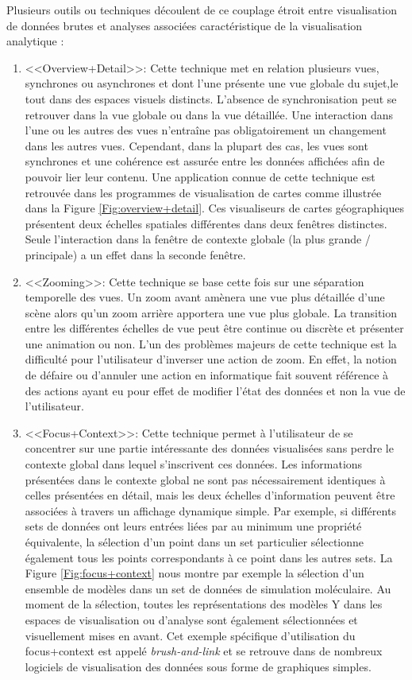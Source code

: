 Plusieurs outils ou techniques découlent de ce couplage étroit entre visualisation de données brutes et analyses associées caractéristique de la visualisation analytique \cite{cockburn2008review}:

\begin{enumerate}
    \item <<Overview+Detail>>: Cette technique met en relation plusieurs vues, synchrones ou asynchrones et dont l'une présente une vue globale du sujet,le tout dans des espaces visuels distincts. L'absence de synchronisation peut se retrouver dans la vue globale ou dans la vue détaillée. Une interaction dans l'une ou les autres des vues n'entraîne pas obligatoirement un changement dans les autres vues. Cependant, dans la plupart des cas, les vues sont synchrones et une cohérence est assurée entre les données affichées afin de pouvoir lier leur contenu. Une application connue de cette technique est retrouvée dans les programmes de visualisation de cartes comme illustrée dans la Figure \ref{Fig:overview+detail}. Ces visualiseurs de cartes géographiques présentent deux échelles spatiales différentes dans deux fenêtres distinctes. Seule l'interaction dans la fenêtre de contexte globale (la plus grande / principale) a un effet dans la seconde fenêtre.
    \item <<Zooming>>: Cette technique se base cette fois sur une séparation temporelle des vues. Un zoom avant amènera une vue plus détaillée d'une scène alors qu'un zoom arrière apportera une vue plus globale. La transition entre les différentes échelles de vue peut être continue ou discrète et présenter une animation ou non. L'un des problèmes majeurs de cette technique est la difficulté pour l'utilisateur d'inverser une action de zoom. En effet, la notion de défaire ou d'annuler une action en informatique fait souvent référence à des actions ayant eu pour effet de modifier l'état des données et non la vue de l'utilisateur.
    \item <<Focus+Context>>: Cette technique permet à l'utilisateur de se concentrer sur une partie intéressante des données visualisées sans perdre le contexte global dans lequel s'inscrivent ces données. Les informations présentées dans le contexte global ne sont pas nécessairement identiques à celles présentées en détail, mais les deux échelles d'information peuvent être associées à travers un affichage dynamique simple. Par exemple, si différents sets de données ont leurs entrées liées par au minimum une propriété équivalente, la sélection d'un point dans un set particulier sélectionne également tous les points correspondants à ce point dans les autres sets. La Figure \ref{Fig:focus+context} nous montre par exemple la sélection d'un ensemble de modèles dans un set de données de simulation moléculaire. Au moment de la sélection, toutes les représentations des modèles Y dans les espaces de visualisation ou d'analyse sont également sélectionnées et visuellement mises en avant. Cet exemple spécifique d'utilisation du focus+context est appelé \textit{brush-and-link} et se retrouve dans de nombreux logiciels de visualisation des données sous forme de graphiques simples.

\end{enumerate}
